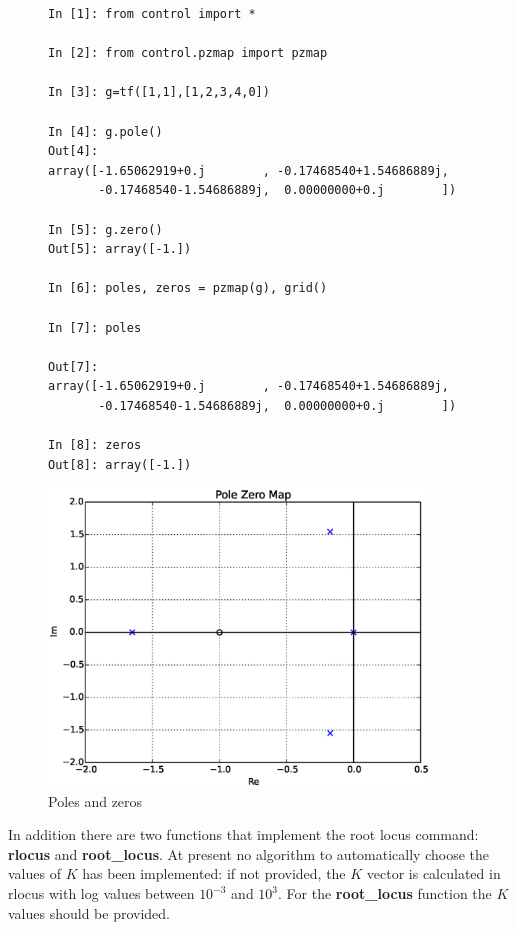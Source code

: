 \begin{figure}[htbp]
\begin{minipage}[t]{0.55\textwidth}
  \vspace{0pt}
\begin{lstlisting}[linewidth=7cm,xleftmargin=0cm]
In [1]: from control import *

In [2]: from control.pzmap import pzmap

In [3]: g=tf([1,1],[1,2,3,4,0])

In [4]: g.pole()
Out[4]: 
array([-1.65062919+0.j        , -0.17468540+1.54686889j,
       -0.17468540-1.54686889j,  0.00000000+0.j        ])

In [5]: g.zero()
Out[5]: array([-1.])

In [6]: poles, zeros = pzmap(g), grid()

In [7]: poles

Out[7]: 
array([-1.65062919+0.j        , -0.17468540+1.54686889j,
       -0.17468540-1.54686889j,  0.00000000+0.j        ])

In [8]: zeros
Out[8]: array([-1.])
\end{lstlisting}

\end{minipage}%
\begin{minipage}[t]{0.5\textwidth}
  \vspace{0pt} \centering
  \includegraphics[width=0.9\textwidth]{eps/pzmap.eps}
\end{minipage}
\caption{Poles and zeros}
\label{F8a}
\end{figure}

In addition there are two functions that implement the root locus command: 
\textbf{rlocus} and \textbf{root\_locus}. At present no algorithm to 
automatically choose the values  of $K$ has been implemented: if not provided, 
the $K$ vector is calculated in rlocus with log values between $10^{-3}$ and 
$10^3$. For the \textbf{root\_locus} function the $K$ values should be 
provided. 

